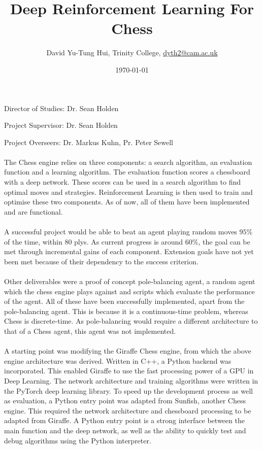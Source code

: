 \documentclass[a4paper]{article}
\title{Deep Reinforcement Learning For Chess}
\author{David Yu-Tung Hui, Trinity College, \url{dyth2@cam.ac.uk}}
\date{\today}
\begin{document}
\maketitle

\centerline{\large Director of Studies: Dr. Sean Holden}
\vspace{0.05in}
\centerline{\large Project Supervisor: Dr. Sean Holden}
\vspace{0.05in}
\centerline{\large Project Overseers: Dr. Markus Kuhn, Pr. Peter Sewell}

\paragraph{} The Chess engine relies on three components: a search algorithm, an evaluation function and a learning algorithm. The evaluation function scores a chessboard with a deep network. These scores can be used in a search algorithm to find optimal moves and strategies. Reinforcement Learning is then used to train and optimise these two components. As of now, all of them have been implemented and are functional.

\paragraph{} A successful project would be able to beat an agent playing random moves $95 \%$ of the time, within 80 plys. As current progress is around $60 \%$, the goal can be met through incremental gains of each component. Extension goals have not yet been met because of their dependency to the success criterion. 

\paragraph{} Other deliverables were a proof of concept pole-balancing agent, a random agent which the chess engine plays against and scripts which evaluate the performance of the agent. All of these have been successfully implemented, apart from the pole-balancing agent. This is because it is a continuous-time problem, whereas Chess is discrete-time. As pole-balancing would require a different architecture to that of a Chess agent, this agent was not implemented.

\paragraph{} A starting point was modifying the Giraffe Chess engine, from which the above engine architecture was derived. Written in C++, a Python backend was incorporated. This enabled Giraffe to use the fast processing power of a GPU in Deep Learning. The network architecture and training algorithms were written in the PyTorch deep learning library. To speed up the development process as well as evaluation, a Python entry point was adapted from Sunfish, another Chess engine. This required the network architecture and chessboard processing to be adapted from Giraffe. A Python entry point is a strong interface between the main function and the deep network, as well as the ability to quickly test and debug algorithms using the Python interpreter.
\end{document}
